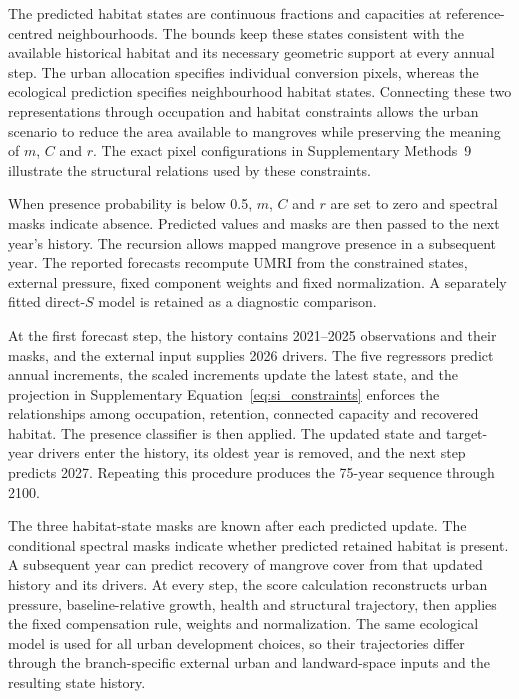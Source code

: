 The predicted habitat states are continuous fractions and capacities at reference-centred neighbourhoods. The bounds keep these states consistent with the available historical habitat and its necessary geometric support at every annual step. The urban allocation specifies individual conversion pixels, whereas the ecological prediction specifies neighbourhood habitat states. Connecting these two representations through occupation and habitat constraints allows the urban scenario to reduce the area available to mangroves while preserving the meaning of $m$, $C$ and $r$. The exact pixel configurations in Supplementary Methods~9 illustrate the structural relations used by these constraints.

When presence probability is below 0.5, $m$, $C$ and $r$ are set to zero and spectral masks indicate absence. Predicted values and masks are then passed to the next year's history. The recursion allows mapped mangrove presence in a subsequent year. The reported forecasts recompute UMRI from the constrained states, external pressure, fixed component weights and fixed normalization. A separately fitted direct-$S$ model is retained as a diagnostic comparison.

At the first forecast step, the history contains 2021--2025 observations and their masks, and the external input supplies 2026 drivers. The five regressors predict annual increments, the scaled increments update the latest state, and the projection in Supplementary Equation~\eqref{eq:si_constraints} enforces the relationships among occupation, retention, connected capacity and recovered habitat. The presence classifier is then applied. The updated state and target-year drivers enter the history, its oldest year is removed, and the next step predicts 2027. Repeating this procedure produces the 75-year sequence through 2100.

The three habitat-state masks are known after each predicted update. The conditional spectral masks indicate whether predicted retained habitat is present. A subsequent year can predict recovery of mangrove cover from that updated history and its drivers. At every step, the score calculation reconstructs urban pressure, baseline-relative growth, health and structural trajectory, then applies the fixed compensation rule, weights and normalization. The same ecological model is used for all urban development choices, so their trajectories differ through the branch-specific external urban and landward-space inputs and the resulting state history.

